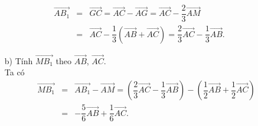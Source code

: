 \begin{vd}
{{		}
		\allowdisplaybreaks
		\begin{eqnarray*}
			\overrightarrow{AB_1}&= & \overrightarrow{GC} = \overrightarrow{AC} - \overrightarrow{AG} = \overrightarrow{AC} - \dfrac{2}{3}\overrightarrow{AM}\\
			&= & \overrightarrow{AC} - \dfrac{1}{3}\left(\overrightarrow{AB} + \overrightarrow{AC}\right) = \dfrac{2}{3}\overrightarrow{AC} - \dfrac{1}{3}\overrightarrow{AB}.
		\end{eqnarray*}
		\begin{enumerate}
			\item[b)] Tính $\overrightarrow{MB_1}$ theo $\overrightarrow{AB}$, $\overrightarrow{AC}$.\\
			Ta có
			\allowdisplaybreaks
			\begin{eqnarray*}
				\overrightarrow{MB_1}&= & \overrightarrow{AB_1} - \overrightarrow{AM} = \left(\dfrac{2}{3}\overrightarrow{AC} - \dfrac{1}{3}\overrightarrow{AB}\right) - \left(\dfrac{1}{2}\overrightarrow{AB} + \dfrac{1}{2}\overrightarrow{AC}\right)\\
				&= & -\dfrac{5}{6}\overrightarrow{AB} + \dfrac{1}{6}\overrightarrow{AC}.
			\end{eqnarray*}
		\end{enumerate}
	}
\end{vd}

